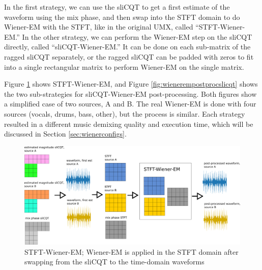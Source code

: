 \documentclass[report.tex]{subfiles}
\begin{document}
In the first strategy, we can use the sliCQT to get a first estimate of the waveform using the mix phase, and then swap into the STFT domain to do Wiener-EM with the STFT, like in the original UMX, called ``STFT-Wiener-EM.'' In the other strategy, we can perform the Wiener-EM step on the sliCQT directly, called ``sliCQT-Wiener-EM.'' It can be done on each sub-matrix of the ragged sliCQT separately, or the ragged sliCQT can be padded with zeros to fit into a single rectangular matrix to perform Wiener-EM on the single matrix.

Figure \ref{fig:wienerempostprocstft} shows STFT-Wiener-EM, and Figure \ref{fig:wienerempostprocslicqt} shows the two sub-strategies for sliCQT-Wiener-EM post-processing. Both figures show a simplified case of two sources, A and B. The real Wiener-EM is done with four sources (vocals, drums, bass, other), but the process is similar. Each strategy resulted in a different music demixing quality and execution time, which will be discussed in Section \ref{sec:wienerconfigs}.

\begin{figure}[ht]
	\centering
	\includegraphics[width=\textwidth]{./images-blockdiagrams/wienerem_stft.png}
	\caption{STFT-Wiener-EM; Wiener-EM is applied in the STFT domain after swapping from the sliCQT to the time-domain waveforms}
	\label{fig:wienerempostprocstft}
\end{figure}
\end{document}
